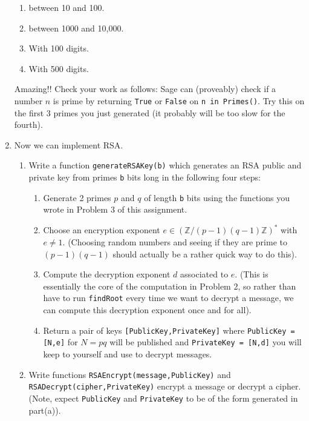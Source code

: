 \documentclass[11pt]{article}
\newcommand{\bZ}{\mathbb{Z}}
\begin{document}
\begin{enumerate}
{\begin{enumerate}
{    \begin{enumerate}
      \item{between 10 and 100.}
      \item{between 1000 and 10,000.}
      \item{With 100 digits.}
      \item{With 500 digits.}
    \end{enumerate}
    Amazing!!  Check your work as follows: Sage can (proveably) check if a number $n$ is prime by returning \verb|True| or \verb|False| on \verb|n in Primes()|.  Try this on the first 3 primes you just generated (it probably will be too slow for the fourth).
    }
  \end{enumerate}
  }
  \item{
  Now we can implement RSA.
  \begin{enumerate}
    \item{
    Write a function \verb|generateRSAKey(b)| which generates an RSA public and private key from primes \verb|b| bits long in the following four steps:
    \begin{enumerate}[(1)]
      \item{
      Generate 2 primes $p$ and $q$ of length \verb|b| bits using the functions you wrote in Problem 3 of this assignment.
      }
      \item{
      Choose an encryption exponent $e\in(\bZ/(p-1)(q-1)\bZ)^*$ with $e\not=1$.  (Choosing random numbers and seeing if they are prime to $(p-1)(q-1)$ should actually be a rather quick way to do this).
      }
      \item{
      Compute the decryption exponent $d$ associated to $e$.  (This is essentially the core of the computation in Problem 2, so rather than have to run \verb|findRoot| every time we want to decrypt a message, we can compute this decryption exponent once and for all).
      }
      \item{
      Return a pair of keys \verb|[PublicKey,PrivateKey]| where \verb|PublicKey = [N,e]| for $N=pq$ will be published and \verb|PrivateKey = [N,d]| you will keep to yourself and use to decrypt messages.
      }
    \end{enumerate}
    }
    \item{
    Write functions \verb|RSAEncrypt(message,PublicKey)| and \verb|RSADecrypt(cipher,PrivateKey)| encrypt a message or decrypt a cipher.  (Note, expect \verb|PublicKey| and \verb|PrivateKey| to be of the form generated in part(a)).
    }
  \end{enumerate}
}
\end{enumerate}
\end{document}

